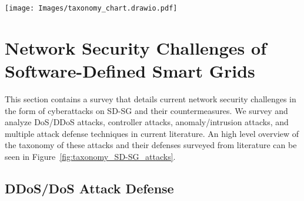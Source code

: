\documentclass[conference]{IEEEtran}
\begin{document}

\begin{figure*}[ht]
\centering
\texttt{[image: Images/taxonomy\_chart.drawio.pdf]}
\caption{Taxonomy of SD-SG Network Security: Cyberattacks and Defense Techniques}
\label{fig:taxonomy_SD-SG_attacks}
\end{figure*}



\section{Network Security Challenges of Software-Defined Smart Grids}
\label{Network Security Challenges of Software-Defined Smart Grids}

This section contains a survey that details current network security challenges in the form of cyberattacks on SD-SG and their countermeasures. We survey and analyze DoS/DDoS attacks, controller attacks, anomaly/intrusion attacks, and multiple attack defense techniques in current literature. An high level overview of the taxonomy of these attacks and their defenses surveyed from literature can be seen in Figure~\ref{fig:taxonomy_SD-SG_attacks}.


\subsection{DDoS/DoS Attack Defense}
\label{Distributed Denial of Service Attack Defens}
\end{document}
